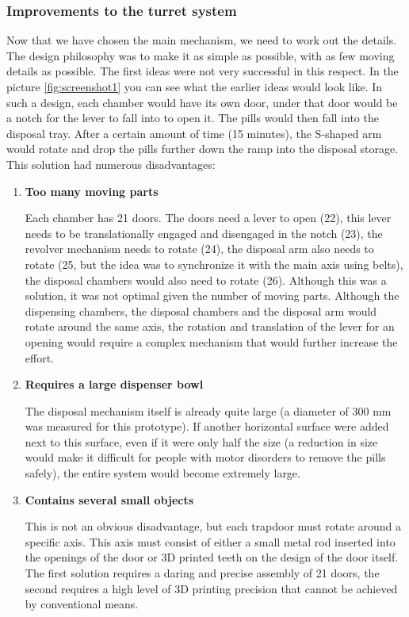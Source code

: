 \subsubsection{Improvements to the turret system}
Now that we have chosen the main mechanism, we need to work out the details. The design philosophy was to make it as simple as possible, with as few moving details as possible. The first ideas were not very successful in this respect. In the picture \ref{fig:screenshot1} you can see what the earlier ideas would look like. In such a design, each chamber would have its own door, under that door would be a notch for the lever to fall into to open it. The pills would then fall into the disposal tray. After a certain amount of time (15 minutes), the S-shaped arm would rotate and drop the pills further down the ramp into the disposal storage. This solution had numerous disadvantages:
\begin{enumerate}
	\item{\textbf{Too many moving parts}}
	
	Each chamber has 21 doors. The doors need a lever to open (22), this lever needs to be translationally engaged and disengaged in the notch (23), the revolver mechanism needs to rotate (24), the disposal arm also needs to rotate (25, but the idea was to synchronize it with the main axis using belts), the disposal chambers would also need to rotate (26). Although this was a solution, it was not optimal given the number of moving parts. Although the dispensing chambers, the disposal chambers and the disposal arm would rotate around the same axis, the rotation and translation of the lever for an opening would require a complex mechanism that would further increase the effort.
	\item{\textbf{Requires a large dispenser bowl}}
	
	The disposal mechanism itself is already quite large (a diameter of 300 mm was measured for this prototype). If another horizontal surface were added next to this surface, even if it were only half the size (a reduction in size would make it difficult for people with motor disorders to remove the pills safely), the entire system would become extremely large.
	\item{\textbf{Contains several small objects}}
	
	This is not an obvious disadvantage, but each trapdoor must rotate around a specific axis. This axis must consist of either a small metal rod inserted into the openings of the door or 3D printed teeth on the design of the door itself. The first solution requires a daring and precise assembly of 21 doors, the second requires a high level of 3D printing precision that cannot be achieved by conventional means.
\end{enumerate}
